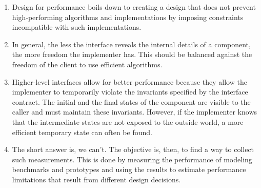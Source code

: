 \begin{enumerate}
\item 
Design for performance boils down to creating a design that does not prevent high-performing algorithms and implementations by imposing constraints incompatible with such implementations.

\item 
In general, the less the interface reveals the internal details of a component, the more freedom the implementer has. This should be balanced against the freedom of the client to use efficient algorithms.

\item 
Higher-level interfaces allow for better performance because they allow the implementer to temporarily violate the invariants specified by the interface contract. The initial and the final states of the component are visible to the caller and must maintain these invariants. However, if the implementer knows that the intermediate states are not exposed to the outside world, a more efficient temporary state can often be found.

\item
The short answer is, we can't. The objective is, then, to find a way to collect such measurements. This is done by measuring the performance of modeling benchmarks and prototypes and using the results to estimate performance limitations that result from different design decisions.

\end{enumerate}